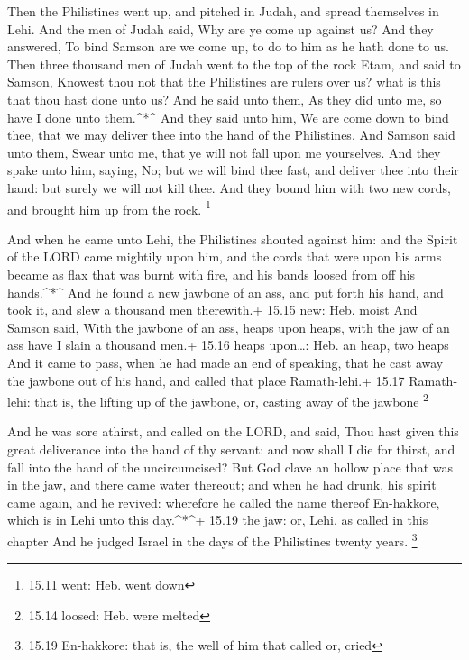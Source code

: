  Then the Philistines went up, and pitched in Judah, and
spread themselves in Lehi.  And the men of Judah said, Why
are ye come up against us? And they answered, To bind Samson are we come
up, to do to him as he hath done to us.  Then three
thousand men of Judah went to the top of the rock Etam, and said to
Samson, Knowest thou not that the Philistines are rulers over us? what
is this that thou hast done unto us? And he said unto them, As they did
unto me, so have I done unto them.\^{}*\^{}  And they said
unto him, We are come down to bind thee, that we may deliver thee into
the hand of the Philistines. And Samson said unto them, Swear unto me,
that ye will not fall upon me yourselves.  And they spake
unto him, saying, No; but we will bind thee fast, and deliver thee into
their hand: but surely we will not kill thee. And they bound him with
two new cords, and brought him up from the rock. \footnote{15.11 went:
  Heb. went down}

 And when he came unto Lehi, the Philistines shouted
against him: and the Spirit of the LORD came mightily upon him, and the
cords that were upon his arms became as flax that was burnt with fire,
and his bands loosed from off his hands.\^{}*\^{}  And he
found a new jawbone of an ass, and put forth his hand, and took it, and
slew a thousand men therewith.+ 15.15 new: Heb. moist  And
Samson said, With the jawbone of an ass, heaps upon heaps, with the jaw
of an ass have I slain a thousand men.+ 15.16 heaps upon\ldots: Heb. an
heap, two heaps  And it came to pass, when he had made an
end of speaking, that he cast away the jawbone out of his hand, and
called that place Ramath-lehi.+ 15.17 Ramath-lehi: that is, the lifting
up of the jawbone, or, casting away of the jawbone \footnote{15.14
  loosed: Heb. were melted}

 And he was sore athirst, and called on the LORD, and said,
Thou hast given this great deliverance into the hand of thy servant: and
now shall I die for thirst, and fall into the hand of the uncircumcised?
 But God clave an hollow place that was in the jaw, and
there came water thereout; and when he had drunk, his spirit came again,
and he revived: wherefore he called the name thereof En-hakkore, which
is in Lehi unto this day.\^{}*\^{}+ 15.19 the jaw: or, Lehi, as called
in this chapter  And he judged Israel in the days of the
Philistines twenty years. \footnote{15.19 En-hakkore: that is, the well
  of him that called or, cried}

